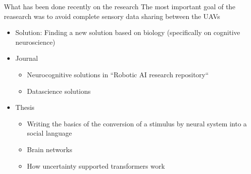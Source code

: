 \begin{frame}[allowframebreaks]{What has been done recently on the research}
    The most important goal of the reasearch was to avoid complete sensory data sharing between the UAVs
    \begin{itemize}
        \item Solution: Finding a new solution based on biology (specifically on cognitive neuroscience)
    \end{itemize}
    \begin{itemize}
        \item Journal
        \begin{itemize}
            \item Neurocognitive solutions in ``Robotic AI research repository`` 
            \item Datascience solutions 
        \end{itemize}
        \item Thesis
        \begin{itemize}
            \item Writing the basics of the conversion of a stimulus by neural system into a social language
            \item Brain networks
            \item How uncertainty supported transformers work
        \end{itemize}
    \end{itemize}
\end{frame}